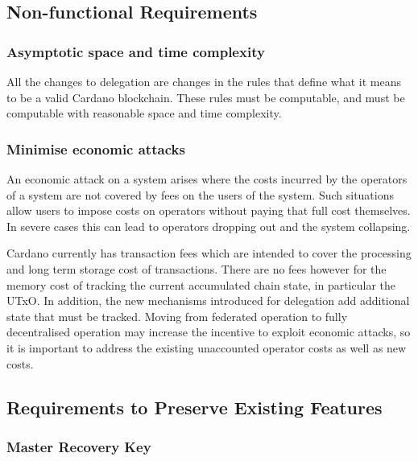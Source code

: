 \documentclass[11pt,a4paper,dvipsnames,twosided]{article}
\begin{document}
\subsection{Non-functional Requirements}
\label{non-functional-requirements}

\subsubsection{Asymptotic space and time complexity}
\label{asymptotic-space-and-time-complexity}

All the changes to delegation are changes in the rules that define what
it means to be a valid Cardano blockchain. These rules must be
computable, and must be computable with reasonable space and time
complexity.

\subsubsection{Minimise economic attacks}
\label{minimise-economic-attacks}

An economic attack on a system arises where the costs incurred by the
operators of a system are not covered by fees on the users of the
system. Such situations allow users to impose costs on operators without
paying that full cost themselves. In severe cases this can lead to
operators dropping out and the system collapsing.

Cardano currently has transaction fees which are intended to cover the
processing and long term storage cost of transactions. There are no fees
however for the memory cost of tracking the current accumulated chain
state, in particular the UTxO. In addition, the new mechanisms
introduced for delegation add additional state that must be tracked.
Moving from federated operation to fully decentralised operation may
increase the incentive to exploit economic attacks, so it is important
to address the existing unaccounted operator costs as well as new costs.

\subsection{Requirements to Preserve Existing Features}
\label{requirements-to-preserve-existing-features}

\subsubsection{Master Recovery Key}
\label{master-recovery-key}
\end{document}
